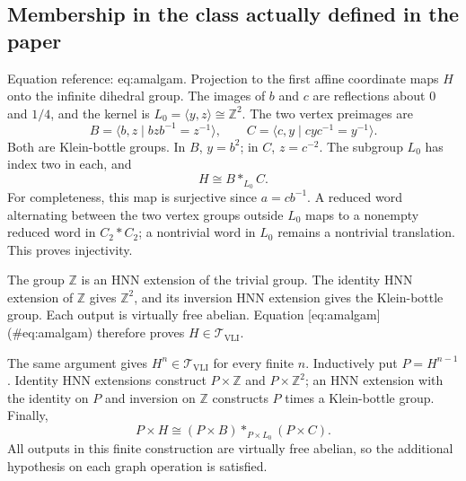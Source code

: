 \documentclass[10pt]{article}
\begin{document}
\subsection*{Membership in the class actually defined in the paper}
Equation reference: eq:amalgam. Projection to the first affine coordinate maps \(H\) onto the infinite dihedral group. The images of \(b\) and \(c\) are reflections about \(0\) and \(1/4\), and the kernel is \(L_0=\langle y,z\rangle\cong\mathbb Z^2\). The two vertex preimages are \[B=\langle b,z\mid bzb^{-1}=z^{-1}\rangle,\qquad
 C=\langle c,y\mid cyc^{-1}=y^{-1}\rangle.\] Both are Klein-bottle groups. In \(B\), \(y=b^2\); in \(C\), \(z=c^{-2}\). The subgroup \(L_0\) has index two in each, and \[
 H\cong B*_{L_0}C .\] For completeness, this map is surjective since \(a=cb^{-1}\). A reduced word alternating between the two vertex groups outside \(L_0\) maps to a nonempty reduced word in \(C_2*C_2\); a nontrivial word in \(L_0\) remains a nontrivial translation. This proves injectivity.\par
The group \(\mathbb Z\) is an HNN extension of the trivial group. The identity HNN extension of \(\mathbb Z\) gives \(\mathbb Z^2\), and its inversion HNN extension gives the Klein-bottle group. Each output is virtually free abelian. Equation [eq:amalgam] (\#eq:amalgam) therefore proves \(H\in\mathcal T_{\mathrm{VLI}}\).\par
The same argument gives \(H^n\in\mathcal T_{\mathrm{VLI}}\) for every finite \(n\). Inductively put \(P=H^{n-1}\). Identity HNN extensions construct \(P\times\mathbb Z\) and \(P\times\mathbb Z^2\); an HNN extension with the identity on \(P\) and inversion on \(\mathbb Z\) constructs \(P\) times a Klein-bottle group. Finally, \[P\times H\cong
 (P\times B)*_{P\times L_0}(P\times C).\] All outputs in this finite construction are virtually free abelian, so the additional hypothesis on each graph operation is satisfied.\par
\end{document}
